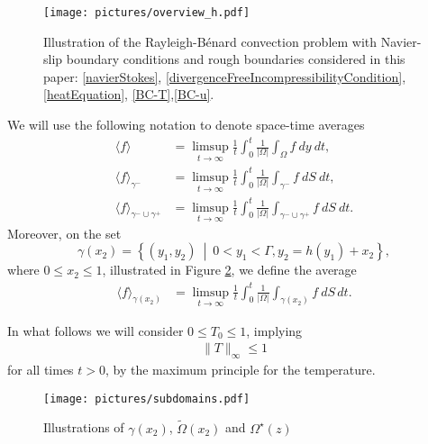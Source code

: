 \documentclass{article}
\theoremstyle{definition}
\theoremstyle{definition}
\begin{document}
\begin{figure}
\centering
   \texttt{[image: pictures/overview\_h.pdf]}
    \caption{Illustration of the Rayleigh-B\'enard convection problem with Navier-slip boundary conditions and rough boundaries considered in this paper: \eqref{navierStokes}, \eqref{divergenceFreeIncompressibilityCondition}, \eqref{heatEquation}, \eqref{BC-T},\eqref{BC-u}.}
    \label{fig:overview}
\end{figure}


We will use the following notation to denote space-time averages
\begin{align*}
    \langle f \rangle &= \limsup_{t\to\infty}\frac{1}{t}\int_0^t \frac{1}{|\Omega|}\int_\Omega f \ dy\ dt,\\
    \langle f \rangle_{\gamma^-} &= \limsup_{t\to\infty}\frac{1}{t}\int_0^t \frac{1}{|\Omega|}\int_{\gamma^-} f \ dS\ dt,\\
    \langle f \rangle_{\gamma^-\cup\gamma^+} &= \limsup_{t\to\infty}\frac{1}{t}\int_0^t \frac{1}{|\Omega|}\int_{\gamma^-\cup\gamma^+} f \ dS\ dt.
\end{align*}
Moreover, on the set 
\begin{equation}\label{strip-av}
    \gamma(x_2)=\left\lbrace(y_1,y_2)\ \middle | \ 0<y_1<\Gamma, y_2=h(y_1)+x_2 \right\rbrace,
\end{equation}
where $0\leq x_2\leq 1$, illustrated in Figure \ref{fig:subdomains}, we define the average
\begin{align*}
    \langle f \rangle_{\gamma(x_2)} &=\limsup_{t\to\infty}\frac{1}{t}\int_0^t \frac{1}{|\Omega|}\int_{\gamma(x_2)} f\ dS\,dt.
\end{align*}

In what follows we will consider $0\leq T_0\leq 1$, implying
\begin{align}
    \label{maximum-principle}
    \|T\|_\infty \leq 1
\end{align}
for all times $t>0$, by the maximum principle for the temperature.

\begin{figure}%
    \texttt{[image: pictures/subdomains.pdf]}
    \caption{Illustrations of $\gamma(x_2)$, $\tilde\Omega(x_2)$ and $\Omega^\star(z)$}
    \label{fig:subdomains}
\end{figure}
\end{document}
